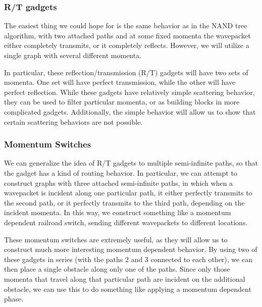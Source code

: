\documentclass[../thesis-main/thesis-main]{subfiles}
\begin{document}


\subsubsection{R/T gadgets}

The easiest thing we could hope for is the same behavior as in the NAND tree algorithm, with two attached paths and at some fixed momenta the wavepacket either completely transmits, or it completely reflects.  However, we will utilize a single graph with several different momenta.

In particular, these reflection/transmission (R/T) gadgets will have two sets of momenta.   One set will have perfect transmission, while the other will have perfect reflection.  While these gadgets have relatively simple scattering behavior, they can be used to filter particular momenta, or as building blocks in more complicated gadgets.  Additionally, the simple behavior will allow us to show that certain scattering behaviors are not possible.


\subsubsection{Momentum Switches}

We can generalize the idea of R/T gadgets to multiple semi-infinite paths, so that the gadget has a kind of routing behavior.  In particular, we can attempt to construct graphs with three attached semi-infinite paths, in which when a wavepacket is incident along one particular path, it either perfectly transmits to the second path, or it perfectly transmits to the third path, depending on the incident momenta.  In this way, we construct something like a momentum dependent railroad switch, sending different wavepackets to different locations.

These momentum switches are extremely useful, as they will allow us to construct much more interesting momentum dependent behavior.  By using two of these gadgets in series (with the paths 2 and 3 connected to each other), we can then place a single obstacle along only one of the paths.  Since only those momenta that travel along that particular path are incident on the additional obstacle, we can use this to do something like applying a momentum dependent phase.
\end{document}
